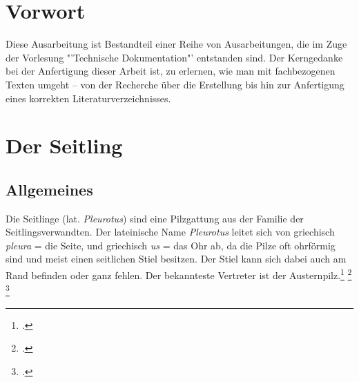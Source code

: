 \documentclass[a4paper,abstracton]{scrreprt}
\begin{document}


\tableofcontents
\pagebreak
\listoffigures

\begin{abstract}
\begin{quote}%
Unter dem Schirmthema \emph{Heimische Pilze} beschäftigt sich diese Ausarbeitung mit den Seitlingen (lat.: "'Pleurotus"'). Es werden unter anderem Kenntnisse über Allgemeinheiten, das Vorkommen, die Beschreibung des Pilzes sowie die bei Pilzen so wichtigen Verwechslungsmöglichkeiten vermittelt. Weiterhin wird eine Auswahl ausgesuchter Arten einzeln betrachtet.
\end{quote} 
\end{abstract}

\chapter{Vorwort}
Diese Ausarbeitung ist Bestandteil einer Reihe von Ausarbeitungen, die im Zuge der Vorlesung "'Technische Dokumentation"' entstanden sind. Der Kerngedanke bei der Anfertigung dieser Arbeit ist, zu erlernen, wie man mit fachbezogenen Texten umgeht -- von der Recherche über die Erstellung bis hin zur Anfertigung eines korrekten Literaturverzeichnisses. 

\chapter{Der Seitling}
\section{Allgemeines}
Die Seitlinge (lat. \emph{Pleurotus}) sind eine Pilzgattung aus der Familie der Seitlingsverwandten.  Der lateinische Name \emph{Pleurotus} leitet sich von griechisch \emph{pleura} = die Seite, und griechisch \emph{us} = das Ohr ab, da die Pilze oft ohrförmig sind und meist einen seitlichen Stiel besitzen. Der Stiel kann sich dabei auch am Rand befinden oder ganz fehlen. Der bekannteste Vertreter ist der Austernpilz.\footcite{hikersnotebook:oystermushroom} \footcite{enzyklo:seitlinge} \footcite{duden:seitlinge}
\end{document}
